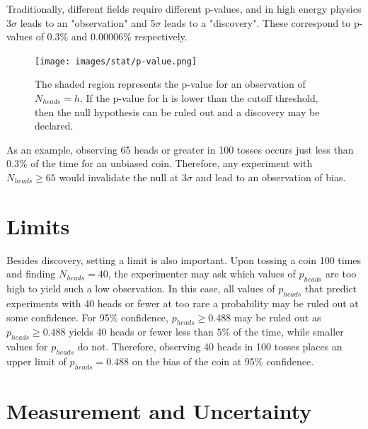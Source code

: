 Traditionally, different fields require different p-values, and in high energy physics 3$\sigma$ leads to an "observation" and 5$\sigma$ leads to a "discovery". These correspond to p-values of 0.3\% and 0.00006\% respectively. 
\begin{figure}[h!]
  \centering
  \texttt{[image: images/stat/p-value.png]}
  \caption[An illustrated example of a p-value.]
   {The shaded region represents the p-value for an observation of $N_{heads}=h$. If the p-value for h is lower than the cutoff threshold, then the null hypothesis can be ruled out and a discovery may be declared.}
\label{fig:pvalue_ex}
\end{figure}
As an example, observing 65 heads or greater in 100 tosses occurs just less than 0.3\% of the time for an unbiased coin. Therefore, any experiment with $N_{heads} \geq 65$ would invalidate the null at $3\sigma$ and lead to an observation of bias.

\section{Limits}

Besides discovery, setting a limit is also important. Upon tossing a coin 100 times and finding $N_{heads}=40$, the experimenter may ask which values of $p_{heads}$ are too high to yield such a low observation. In this case, all values of $p_{heads}$ that predict experiments with 40 heads or fewer at too rare a probability may be ruled out at some confidence. For 95\% confidence, $p_{heads} \geq 0.488$ may be ruled out as $p_{heads} \geq 0.488$ yields 40 heads or fewer less than $5\%$ of the time, while smaller values for $p_{heads}$ do not. Therefore, observing 40 heads in 100 tosses places an upper limit of $p_{heads}=0.488$ on the bias of the coin at 95\% confidence. 

\section{Measurement and Uncertainty}
\label{meas}
 
